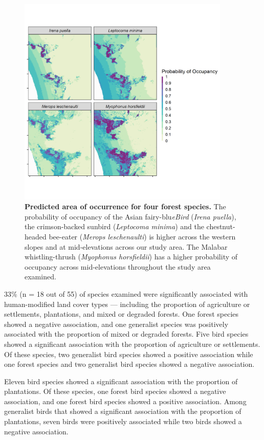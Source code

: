 \begin{figure}[h!]
    \centering
    \includegraphics[width=0.9\textwidth]{figures/hillybirds/fig_06.png}
    \caption{
        \textbf{Predicted area of occurrence for four forest species.} 
        The probability of occupancy of the Asian fairy-blu\textit{eBird} (\textit{Irena puella}), the crimson-backed sunbird (\textit{Leptocoma minima}) and the chestnut-headed bee-eater (\textit{Merops leschenaulti}) is higher across the western slopes and at mid-elevations across our study area. The Malabar whistling-thrush (\textit{Myophonus horsfieldii}) has a higher probability of occupancy across mid-elevations throughout the study area examined.
    }
    \label{hilly_fig_06}
\end{figure}

33\% (n = 18 out of 55) of species examined were significantly associated with human-modified land cover types --- including the proportion of agriculture or settlements, plantations, and mixed or degraded forests.
One forest species showed a negative association, and one generalist species was positively associated with the proportion of mixed or degraded forests.
Five bird species showed a significant association with the proportion of agriculture or settlements.
Of these species, two generalist bird species showed a positive association while one forest species and two generalist bird species showed a negative association.

Eleven bird species showed a significant association with the proportion of plantations.
Of these species, one forest bird species showed a negative association, and one forest bird species showed a positive association.
Among generalist birds that showed a significant association with the proportion of plantations, seven birds were positively associated while two birds showed a negative association.

